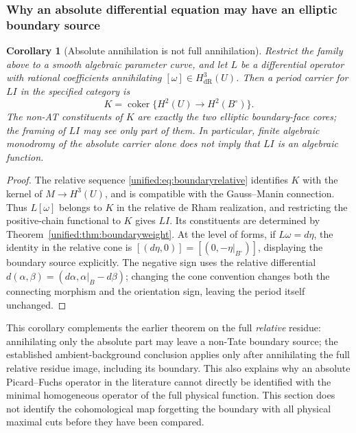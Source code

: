 \documentclass[11pt,a4paper,oneside]{article}
\theoremstyle{plain}
\newtheorem{corollary}[theorem]{Corollary}
\theoremstyle{definition}
\theoremstyle{remark}
\newcommand{\dR}{\mathrm{dR}}
\numberwithin{equation}{section}
\begin{document}
\subsubsection{Why an absolute differential equation may have an elliptic boundary source}
\begin{corollary}[Absolute annihilation is not full annihilation]\label{unified:cor:boundarysource}
Restrict the family above to a smooth algebraic parameter curve, and let $L$ be a differential operator with rational coefficients annihilating $[\omega]\in H^3_{\dR}(U)$.
Then a period carrier for $LI$ in the specified category is
\[
 K=\operatorname{coker}\{H^2(U)\longrightarrow H^2(B^\circ)\}.
\]
The non-AT constituents of $K$ are exactly the two elliptic boundary-face cores; the framing of $LI$ may see only part of them.
In particular, finite algebraic monodromy of the absolute carrier alone does not imply that $LI$ is an algebraic function.
\end{corollary}
\begin{proof}
The relative sequence \eqref{unified:eq:boundaryrelative} identifies $K$ with
the kernel of $M\to H^3(U)$, and is compatible with the Gauss--Manin connection.
Thus $L[\omega]$ belongs to $K$ in the relative de Rham realization,
and restricting the positive-chain functional to $K$ gives $LI$. Its constituents are determined by Theorem~\ref{unified:thm:boundaryweight}.
At the level of forms, if $L\omega=d\eta$, the identity in the relative cone is
$[(d\eta,0)]=[(0,-\eta|_{B^\circ})]$, displaying the boundary source explicitly.
The negative sign uses the relative differential $d(\alpha,\beta)=(d\alpha,\alpha|_B-d\beta)$;
changing the cone convention changes both the connecting morphism and the orientation sign, leaving the period itself unchanged.
\end{proof}

This corollary complements the earlier theorem on the full \emph{relative} residue:
annihilating only the absolute part may leave a non-Tate boundary source;
the established ambient-background conclusion applies only after annihilating the full relative residue image, including its boundary.
This also explains why an absolute Picard--Fuchs operator in the literature cannot directly be identified
with the minimal homogeneous operator of the full physical function. This section does not identify the cohomological map forgetting the boundary with all physical maximal cuts before they have been compared.
\end{document}
